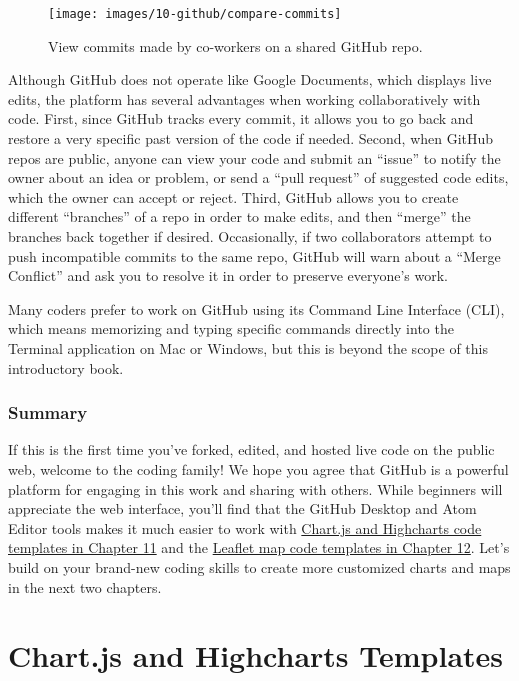 \documentclass[
  english,
]{book}
\begin{document}
\begin{figure}
\texttt{[image: images/10-github/compare-commits]} \caption{View commits made by co-workers on a shared GitHub repo.}\label{fig:compare-commits}
\end{figure}

Although GitHub does not operate like Google Documents, which displays live edits, the platform has several advantages when working collaboratively with code. First, since GitHub tracks every commit, it allows you to go back and restore a very specific past version of the code if needed. Second, when GitHub repos are public, anyone can view your code and submit an ``issue'' to notify the owner about an idea or problem, or send a ``pull request'' of suggested code edits, which the owner can accept or reject. Third, GitHub allows you to create different ``branches'' of a repo in order to make edits, and then ``merge'' the branches back together if desired. Occasionally, if two collaborators attempt to push incompatible commits to the same repo, GitHub will warn about a ``Merge Conflict'' and ask you to resolve it in order to preserve everyone's work.

Many coders prefer to work on GitHub using its Command Line Interface (CLI), which means memorizing and typing specific commands directly into the Terminal application on Mac or Windows, but this is beyond the scope of this introductory book.

\hypertarget{summary10}{%
\subsection*{Summary}\label{summary10}}

If this is the first time you've forked, edited, and hosted live code on the public web, welcome to the coding family! We hope you agree that GitHub is a powerful platform for engaging in this work and sharing with others. While beginners will appreciate the web interface, you'll find that the GitHub Desktop and Atom Editor tools makes it much easier to work with \href{chartcode.html}{Chart.js and Highcharts code templates in Chapter 11} and the \href{leaflet.html}{Leaflet map code templates in Chapter 12}. Let's build on your brand-new coding skills to create more customized charts and maps in the next two chapters.

\hypertarget{chartcode}{%
\chapter{Chart.js and Highcharts Templates}\label{chartcode}}
\end{document}
